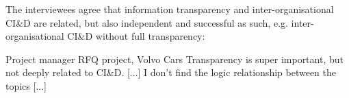 %
%
%
%
%
%
%
%
 The interviewees agree that %
information transparency and inter-organisational CI\&D are related, %
but also independent and successful as such, e.g. inter-organisational CI\&D without full transparency: 

\begin{aquote}{Project manager RFQ project, Volvo Cars}
 Transparency is super important, but not deeply related to CI\&D. [...] I don't find the logic relationship  between the topics [...] %
\end{aquote}

